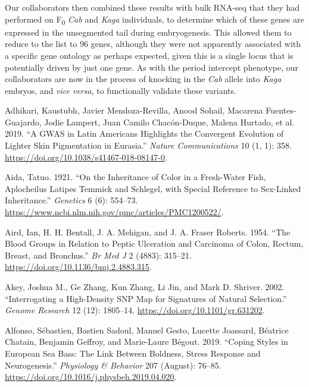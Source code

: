\documentclass[
]{book}
\newlength{\cslhangindent}
\newlength{\cslentryspacingunit} %
\newenvironment{CSLReferences}[2] %
 {%
  \setlength{\parindent}{0pt}
  \ifodd #1
  \let\oldpar\par
  \def\par{\hangindent=\cslhangindent\oldpar}
  \fi
  \setlength{\parskip}{#2\cslentryspacingunit}
 }%
 {}
\begin{document}
Our collaborators then combined these results with bulk RNA-seq that they had performed on F\textsubscript{0} \emph{Cab} and \emph{Kaga} individuals, to determine which of these genes are expressed in the unsegmented tail during embryogenesis. This allowed them to reduce to the list to 96 genes, although they were not apparently associated with a specific gene ontology as perhaps expected, given this is a single locus that is potentially driven by just one gene. As with the period intercept phenotype, our collaborators are now in the process of knocking in the \emph{Cab} allele into \emph{Kaga} embryos, and \emph{vice versa}, to functionally validate these variants.

\hypertarget{refs}{}
\begin{CSLReferences}{1}{0}
\leavevmode{}%
Adhikari, Kaustubh, Javier Mendoza-Revilla, Anood Sohail, Macarena Fuentes-Guajardo, Jodie Lampert, Juan Camilo Chacón-Duque, Malena Hurtado, et al. 2019. {``A {GWAS} in {Latin Americans} Highlights the Convergent Evolution of Lighter Skin Pigmentation in {Eurasia}.''} \emph{Nature Communications} 10 (1, 1): 358. \url{https://doi.org/10.1038/s41467-018-08147-0}.

\leavevmode{}%
Aida, Tatuo. 1921. {``On the {Inheritance} of {Color} in a {Fresh-Water Fish}, {Aplocheilus Latipes Temmick} and {Schlegel}, with {Special Reference} to {Sex-Linked Inheritance}.''} \emph{Genetics} 6 (6): 554--73. \url{https://www.ncbi.nlm.nih.gov/pmc/articles/PMC1200522/}.

\leavevmode{}%
Aird, Ian, H. H. Bentall, J. A. Mehigan, and J. A. Fraser Roberts. 1954. {``The {Blood Groups} in {Relation} to {Peptic Ulceration} and {Carcinoma} of {Colon}, {Rectum}, {Breast}, and {Bronchus}.''} \emph{Br Med J} 2 (4883): 315--21. \url{https://doi.org/10.1136/bmj.2.4883.315}.

\leavevmode{}%
Akey, Joshua M., Ge Zhang, Kun Zhang, Li Jin, and Mark D. Shriver. 2002. {``Interrogating a {High-Density SNP Map} for {Signatures} of {Natural Selection}.''} \emph{Genome Research} 12 (12): 1805--14. \url{https://doi.org/10.1101/gr.631202}.

\leavevmode{}%
Alfonso, Sébastien, Bastien Sadoul, Manuel Gesto, Lucette Joassard, Béatrice Chatain, Benjamin Geffroy, and Marie-Laure Bégout. 2019. {``Coping Styles in {European} Sea Bass: {The} Link Between Boldness, Stress Response and Neurogenesis.''} \emph{Physiology \& Behavior} 207 (August): 76--85. \url{https://doi.org/10.1016/j.physbeh.2019.04.020}.


\end{CSLReferences}
\end{document}
